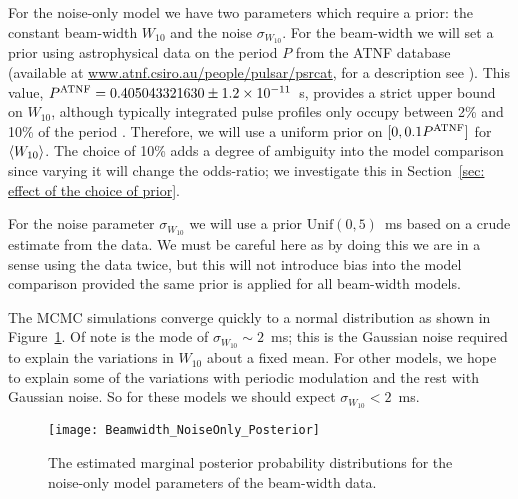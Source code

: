 \documentclass[../full_thesis/full_thesis.tex]{subfiles}
\begin{document}
For the noise-only model we have two parameters which require a prior: the
constant beam-width $W_{10}$ and the noise $\sigma_{W_{10}}$. For the
beam-width we will set a prior using astrophysical data on the period $P$
from the ATNF database
(available at \url{www.atnf.csiro.au/people/pulsar/psrcat}, for a description
see \cite{ATNF}). This value, $P^{\mathrm{ATNF}}=0.405043321630\pm 1.2\times10^{-11}$~s,
provides a strict upper bound on $W_{10}$, although typically integrated
pulse profiles only occupy between 2\% and 10\% of the period \citep{Lyne1988}.
Therefore, we will use a uniform prior on $[0, 0.1 P^{\mathrm{ATNF}}]$ for $\langle W_{10} \rangle$.
The choice of 10\% adds a degree of ambiguity into the model comparison since
varying it will change the odds-ratio; we investigate this in
Section~\ref{sec: effect of the choice of prior}.

For the noise parameter
$\sigma_{W_{10}}$ we will use a prior $\textrm{Unif}(0, 5)$~ms
based on a crude estimate from the data. We must be careful here as by doing
this we are in a sense using the data twice, but this will not introduce bias
into the model comparison provided the same prior is applied for all beam-width
models.

The MCMC simulations converge quickly to a normal distribution as shown in
Figure~\ref{fig: noise-only beam-width posterior}. Of note is the mode of
$\sigma_{W_{10}}\sim 2$~ms; this is the Gaussian noise required to explain the
variations in $W_{10}$ about a fixed mean. For other models, we hope to explain
some of the variations with periodic modulation and the rest with Gaussian
noise. So for these models we should expect $\sigma_{W_{10}} < 2$~ms.

\begin{figure}[htb]
\centering
\texttt{[image: Beamwidth\_NoiseOnly\_Posterior]}
\caption{The estimated marginal posterior probability distributions for the
noise-only model parameters of the beam-width data.}
\label{fig: noise-only beam-width posterior}
\end{figure}
\end{document}
